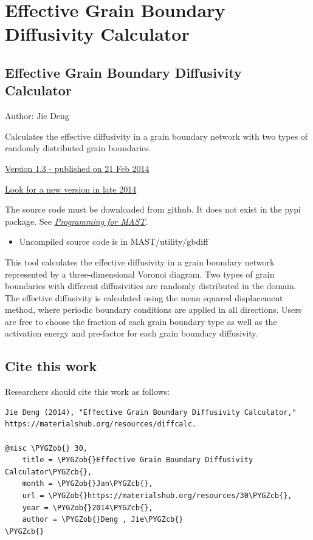 \documentclass[letterpaper,10pt,english]{sphinxmanual}
\def\PYGZob{\char`\{}
\def\PYGZcb{\char`\}}
\begin{document}
\section{Effective Grain Boundary Diffusivity Calculator}
\label{8_0_standalonetools:effective-grain-boundary-diffusivity-calculator}

\subsection{Effective Grain Boundary Diffusivity Calculator}
\label{8_0_2_gbdiff:effective-grain-boundary-diffusivity-calculator}\label{8_0_2_gbdiff::doc}
Author: Jie Deng

Calculates the effective diffusivity in a grain boundary network with two types of randomly distributed grain boundaries.

\href{https://materialshub.org/resources/diffcalc}{Version 1.3 - published on 21 Feb 2014}

\href{https://materialshub.org/resources/gbdiff}{Look for a new version in late 2014}

The source code must be downloaded from github. It does not exist in the pypi package. See {\hyperref[12_0_programming::doc]{\emph{Programming for MAST}}}.
\begin{itemize}
\item {} 
Uncompiled source code is in MAST/utility/gbdiff

\end{itemize}

This tool calculates the effective diffusivity in a grain boundary network represented by a three-dimensional Voronoi diagram.
Two types of grain boundaries with different diffusivities are randomly distributed in the domain.
The effective diffusivity is calculated using the mean squared displacement method, where periodic boundary conditions are applied in all directions.
Users are free to choose the fraction of each grain boundary type as well as the activation energy and pre-factor for each grain boundary diffusivity.


\subsection{Cite this work}
\label{8_0_2_gbdiff:cite-this-work}
Researchers should cite this work as follows:

\begin{Verbatim}[commandchars=\\\{\}]
Jie Deng (2014), "Effective Grain Boundary Diffusivity Calculator," https://materialshub.org/resources/diffcalc.

@misc \PYGZob{} 30,
    title = \PYGZob{}Effective Grain Boundary Diffusivity Calculator\PYGZcb{},
    month = \PYGZob{}Jan\PYGZcb{},
    url = \PYGZob{}https://materialshub.org/resources/30\PYGZcb{},
    year = \PYGZob{}2014\PYGZcb{},
    author = \PYGZob{}Deng , Jie\PYGZcb{}
\PYGZcb{}
\end{Verbatim}
\end{document}
